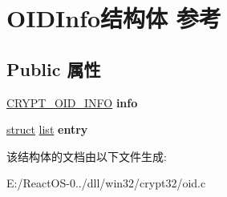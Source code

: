 \hypertarget{struct_o_i_d_info}{}\section{O\+I\+D\+Info结构体 参考}
\label{struct_o_i_d_info}
\subsection*{Public 属性}
\begin{DoxyCompactItemize}
\item 
\mbox{\label{struct_o_i_d_info_a14e1206aa8da5d1bc59a25de30b4a899}} 
\hyperlink{struct___c_r_y_p_t___o_i_d___i_n_f_o}{C\+R\+Y\+P\+T\+\_\+\+O\+I\+D\+\_\+\+I\+N\+FO} {\bfseries info}
\item 
\mbox{\label{struct_o_i_d_info_a4854387b20a5994e20d1e64d52a363c3}} 
\hyperlink{interfacestruct}{struct} \hyperlink{classlist}{list} {\bfseries entry}
\end{DoxyCompactItemize}


该结构体的文档由以下文件生成\+:\begin{DoxyCompactItemize}
\item 
E\+:/\+React\+O\+S-\/0../dll/win32/crypt32/oid.\+c\end{DoxyCompactItemize}
